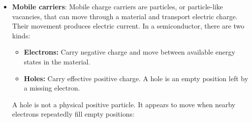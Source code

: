 \documentclass{report}
\begin{document}
\begin{itemize}
            \bigbreak \noindent 
            \bigbreak \noindent 
            When current is flowing through a diode, the voltage on the positive pin (anode) is higher than on the negative pin (cathode). This is called the diode's forward voltage drop and needs to be taken into account when trying to determine what size resistor you need to use
            \bigbreak \noindent 
            The diode depletion layer (or depletion region) is an insulating zone at the junction of p-type and n-type semiconductor materials where mobile charge carriers have recombined, leaving behind fixed ions with no free carriers to conduct current
            \bigbreak \noindent 
            A PN Junction Diode joins p-type material (filled with positive holes) and n-type material (filled with free electrons).
            \bigbreak \noindent 
            Electrons from the n-side cross into the p-side and combine with holes.  This movement leaves behind positive ions on the n-side and negative ions on the p-side.  These charges create an internal electric field that stops further diffusion, forming the depleted layer.
            \bigbreak \noindent 
            \begin{itemize}
                \item \textbf{Forward Bias:} Connecting a positive voltage to the p-side and negative to the n-side shrinks the depletion layer, letting current flow past a threshold (about 0.7V for silicon).
                \item \textbf{Reverse Bias:} Reversing the voltage expands the depletion layer, blocking current flow completely
            \end{itemize}
        \item \textbf{Mobile carriers}: Mobile charge carriers are particles, or particle-like vacancies, that can move through a material and transport electric charge. Their movement produces electric current.
            \bigbreak \noindent 
            In a semiconductor, there are two kinds:
            \begin{itemize}
                \item \textbf{Electrons:} Carry negative charge and move between available energy states in the material.
                \item \textbf{Holes:} Carry effective positive charge. A hole is an empty position left by a missing electron.
            \end{itemize}
            A hole is not a physical positive particle. It appears to move when nearby electrons repeatedly fill empty positions:

\end{itemize}
\end{document}
